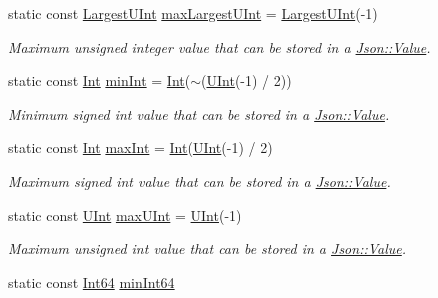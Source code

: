 \begin{DoxyCompactItemize}
static const \hyperlink{classJson_1_1Value_a6682a3684d635e03fc06ba229fa24eec}{Largest\+U\+Int} \hyperlink{classJson_1_1Value_a8ddb32d9d55fa5323ae5135639dc2e31}{max\+Largest\+U\+Int} = \hyperlink{classJson_1_1Value_a6682a3684d635e03fc06ba229fa24eec}{Largest\+U\+Int}(-\/1)
\begin{DoxyCompactList}\small\item\em Maximum unsigned integer value that can be stored in a \hyperlink{classJson_1_1Value}{Json\+::\+Value}. \end{DoxyCompactList}\item 
static const \hyperlink{classJson_1_1Value_abdf7a7ff73eb130ffcab28504ffdb405}{Int} \hyperlink{classJson_1_1Value_a7df8a39e2502b8c92a6a41e3d752d2c8}{min\+Int} = \hyperlink{classJson_1_1Value_abdf7a7ff73eb130ffcab28504ffdb405}{Int}($\sim$(\hyperlink{classJson_1_1Value_a0933d59b45793ae4aade1757c322a98d}{U\+Int}(-\/1) / 2))
\begin{DoxyCompactList}\small\item\em Minimum signed int value that can be stored in a \hyperlink{classJson_1_1Value}{Json\+::\+Value}. \end{DoxyCompactList}\item 
static const \hyperlink{classJson_1_1Value_abdf7a7ff73eb130ffcab28504ffdb405}{Int} \hyperlink{classJson_1_1Value_a978c799a8af3114ef7dab6fd0a310a1b}{max\+Int} = \hyperlink{classJson_1_1Value_abdf7a7ff73eb130ffcab28504ffdb405}{Int}(\hyperlink{classJson_1_1Value_a0933d59b45793ae4aade1757c322a98d}{U\+Int}(-\/1) / 2)
\begin{DoxyCompactList}\small\item\em Maximum signed int value that can be stored in a \hyperlink{classJson_1_1Value}{Json\+::\+Value}. \end{DoxyCompactList}\item 
static const \hyperlink{classJson_1_1Value_a0933d59b45793ae4aade1757c322a98d}{U\+Int} \hyperlink{classJson_1_1Value_ac79e63ee68d3aa914bfd6988be669b87}{max\+U\+Int} = \hyperlink{classJson_1_1Value_a0933d59b45793ae4aade1757c322a98d}{U\+Int}(-\/1)
\begin{DoxyCompactList}\small\item\em Maximum unsigned int value that can be stored in a \hyperlink{classJson_1_1Value}{Json\+::\+Value}. \end{DoxyCompactList}\item 
static const \hyperlink{classJson_1_1Value_a1b86af9f85f0f1baa972c3319fa22695}{Int64} \hyperlink{classJson_1_1Value_a815ef899bc312c93bc426511acfe31a7}{min\+Int64}

\end{DoxyCompactItemize}
